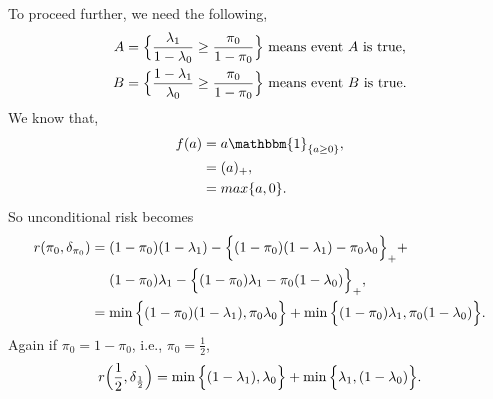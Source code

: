 \documentclass[a4paper,english,12pt]{article}
\begin{document}
\begin{exmp}
To proceed further, we need the following, 
\begin{align}
A&=\Bigl\{\frac{\lambda_{1}}{1-\lambda_{0}}\geq\dfrac{\pi_{0}}{1-\pi_{0}}\Bigr\}~\mbox{means~event~$A$~is~true},\nonumber\\
B&=\Bigl\{\frac{1-\lambda_{1}}{\lambda_{0}}\geq\dfrac{\pi_{0}}{1-\pi_{0}}\Bigr\}~\mbox{means~event~$B$~is~true}.\nonumber
\end{align}
We know that,
\begin{align}
f(a)&=a\mathbbm{1}_{\{a\geq0\}},\nonumber\\
	&=(a)_{+},\nonumber\\
	&=max\{a,0\}.
\end{align}
So unconditional risk becomes
\begin{align}
r(\pi_{0},\delta_{\pi_{0}})&=(1-\pi_{0})(1-\lambda_{1})-{\Bigl\{(1-\pi_{0})(1-\lambda_{1})-\pi_{0}\lambda_{0}\Bigr\}}_{+}+\nonumber\\
									  &~~~~(1-\pi_{0})\lambda_{1}-{\Bigl\{(1-\pi_{0})\lambda_{1}-\pi_{0}(1-\lambda_{0})\Bigr\}}_{+},\nonumber\\
									  &=\min{\Bigl\{(1-\pi_{0})(1-\lambda_{1}),\pi_{0}\lambda_{0}\Bigr\}}+\min{\Bigl\{(1-\pi_{0})\lambda_{1},\pi_{0}(1-\lambda_{0})\Bigr\}}.\label{eq:70}
\end{align}
Again if $\pi_{0}=1-\pi_{0}$, i.e., $\pi_{0}=\frac{1}{2}$,
\begin{equation}
r\Bigl(\frac{1}{2},\delta_{\frac{1}{2}}\Bigr)= \min{\Bigl\{(1-\lambda_{1}),\lambda_{0}\Bigr\}}+\min{\Bigl\{\lambda_{1},(1-\lambda_{0})\Bigr\}}.
\end{equation}

\end{exmp}
\end{document}
